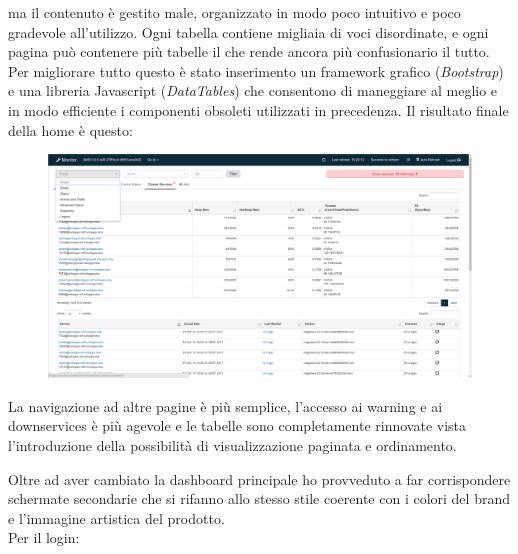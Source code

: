\documentclass[a4paper]{article}
\begin{document}
ma il contenuto è gestito male, organizzato in modo poco intuitivo e poco gradevole all'utilizzo.
Ogni tabella contiene migliaia di voci disordinate, e ogni pagina può contenere più tabelle
il che rende ancora più confusionario il tutto. Per migliorare tutto questo è stato inserimento
un framework grafico (\emph{Bootstrap}) e una libreria Javascript (\emph{DataTables}) che consentono
di maneggiare al meglio e in modo efficiente i componenti obsoleti utilizzati in precedenza.
Il risultato finale della home è questo:
\begin{figure}[H]
	\includegraphics[width=\textwidth]{dashboard_new.png}
	\centering
\end{figure}
La navigazione ad altre pagine è più semplice, l'accesso ai warning e ai downservices
è più agevole e le tabelle sono completamente rinnovate vista l'introduzione della possibilità di
visualizzazione paginata e ordinamento.
\par Oltre ad aver cambiato la dashboard principale ho provveduto a far corrispondere schermate secondarie
che si rifanno allo stesso stile coerente con i colori del brand e l'immagine artistica del prodotto.\\
Per il login:
\end{document}
